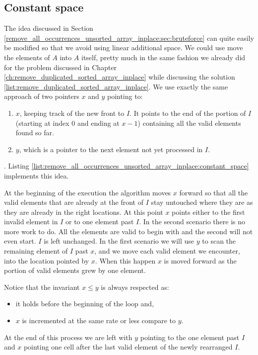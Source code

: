 \subsection{Constant space}
\label{remove_all_occurrences_unsorted_array_inplace:sec:constant_space}
The idea discussed in Section \ref{remove_all_occurrences_unsorted_array_inplace:sec:bruteforce} can quite easily be modified so that we avoid using linear
additional space. We could use move the elements of $A$ into $A$ itself, pretty much in the same fashion we already did for the problem discussed in Chapter \ref{ch:remove_duplicated_sorted_array_inplace}
while discussing the solution \ref{list:remove_duplicated_sorted_array_inplace}. 
We use exactly the same approach of two pointers $x$ and $y$ pointing to:
\begin{enumerate}
	\item $x$, keeping track of the new front to $I$. It points to the end of the portion of $I$ (starting at index $0$ and ending at $x-1$) containing all the valid elements found so far.
	\item $y$, which is a pointer to the next element not yet processed in $I$.
\end{enumerate}.
Listing \ref{list:remove_all_occurrences_unsorted_array_inplace:constant_space} implements this idea.

At the beginning of the execution the algorithm moves $x$ forward so that all the valid elements that are already
at the front of $I$ stay untouched where they are as they are already in the right locations.
At this point $x$ points either to the first invalid element in $I$ or to one element past $I$.
In the second scenario there is no more work to do. All the elements are valid to begin with and the second 
will not even start. $I$ is left unchanged.
In the first scenario we will use $y$ to scan the remaining element of $I$ past $x$, and we move each valid element we encounter, 
into the location pointed by $x$. When this happen $x$ is moved forward as the portion of valid elements grew by one element. 

Notice that the invariant $x \leq y$ is always respected as:
\begin{itemize}
	\item it holds before the beginning of the loop and,
	\item $x$ is incremented at the same rate or less compare to $y$.
\end{itemize}
At the end of this process we are left with $y$ pointing to the one element past $I$ and $x$ pointing one cell after the last valid element of the newly rearranged $I$.




